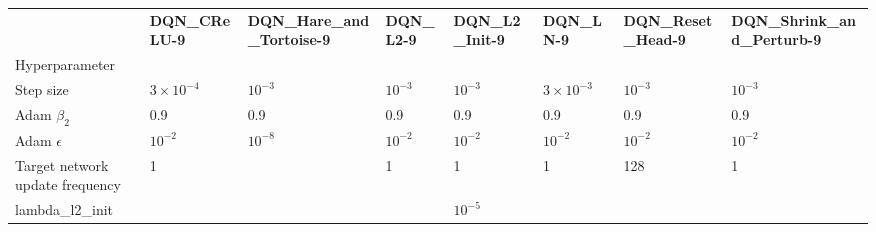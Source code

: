\begin{tabular}{llllllll}
 & \bfseries DQN_CReLU-9 & \bfseries DQN_Hare_and_Tortoise-9 & \bfseries DQN_L2-9 & \bfseries DQN_L2_Init-9 & \bfseries DQN_LN-9 & \bfseries DQN_Reset_Head-9 & \bfseries DQN_Shrink_and_Perturb-9 \\
Hyperparameter &  &  &  &  &  &  &  \\
Step size & $3 \times 10^{-4}$ & $10^{-3}$ & $10^{-3}$ & $10^{-3}$ & $3 \times 10^{-3}$ & $10^{-3}$ & $10^{-3}$ \\
Adam $\beta_2$ & 0.9 & 0.9 & 0.9 & 0.9 & 0.9 & 0.9 & 0.9 \\
Adam $\epsilon$ & $10^{-2}$ & $10^{-8}$ & $10^{-2}$ & $10^{-2}$ & $10^{-2}$ & $10^{-2}$ & $10^{-2}$ \\
Target network update frequency & 1 &  & 1 & 1 & 1 & 128 & 1 \\
lambda_l2_init &  &  &  & $10^{-5}$ &  &  &  \\
\end{tabular}
